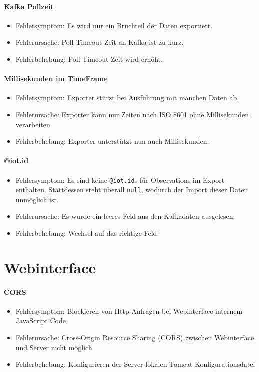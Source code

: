 \paragraph{Kafka Pollzeit}
\begin{itemize}
	\item Fehlersymptom: Es wird nur ein Bruchteil der Daten exportiert.
	\item Fehlerursache: Poll Timeout Zeit an Kafka ist zu kurz.
	\item Fehlerbehebung: Poll Timeout Zeit wird erhöht.
\end{itemize}

\paragraph{Millisekunden im TimeFrame}
\begin{itemize}
	\item Fehlersymptom: Exporter stürzt bei Ausführung mit manchen Daten ab.
	\item Fehlerursache: Exporter kann nur Zeiten nach ISO 8601 ohne Millisekunden verarbeiten.
	\item Fehlerbehebung: Exporter unterstützt nun auch Millisekunden.
\end{itemize}

\paragraph{@iot.id}
\begin{itemize}
	\item Fehlersymptom: Es sind keine \texttt{@iot.id}s für Observations im Export enthalten. Stattdessen steht überall \texttt{null}, wodurch der Import dieser Daten unmöglich ist.
	\item Fehlerursache: Es wurde ein leeres Feld aus den Kafkadaten ausgelesen.
	\item Fehlerbehebung: Wechsel auf das richtige Feld.
\end{itemize}
\newpage
\section{Webinterface}
\paragraph{CORS}
\begin{itemize}
	\item Fehlersymptom: Blockieren von Http-Anfragen bei Webinterface-internem JavaScript Code
	\item Fehlerursache: Cross-Origin Resource Sharing (CORS) zwischen Webinterface und Server nicht möglich
	\item Fehlerbehebung: Konfigurieren der Server-lokalen Tomcat Konfigurationsdatei
\end{itemize}

